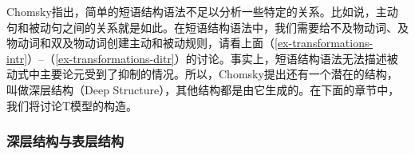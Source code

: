Chomsky指出，简单的短语结构语法不足以分析一些特定的关系。比如说，主动句和被动句之间的关系就是如此。在短语结构语法中，我们需要给不及物动词、及物动词和双及物动词创建主动和被动规则，请看上面（\ref{ex-transformations-intr}）--（\ref{ex-transformations-ditr}）的讨论。事实上，短语结构语法无法描述被动式中主要论元受到了抑制的情况。所以，Chomsky提出还有一个潜在的结构，叫做深层结构（Deep Structure），其他结构都是由它生成的。在下面的章节中，我们将讨论T模型的构造。

\subsubsection{深层结构与表层结构}

